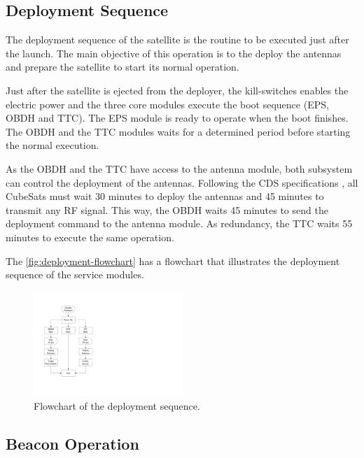 \subsection{Deployment Sequence}

The deployment sequence of the satellite is the routine to be executed just after the launch. The main objective of this operation is to the deploy the antennas and prepare the satellite to start its normal operation.

Just after the satellite is ejected from the deployer, the kill-switches enables the electric power and the three core modules execute the boot sequence (EPS, OBDH and TTC). The EPS module is ready to operate when the boot finishes. The OBDH and the TTC modules waits for a determined period before starting the normal execution.

As the OBDH and the TTC have access to the antenna module, both subsystem can control the deployment of the antennas. Following the CDS specifications \cite{cds}, all CubeSats must wait 30 minutes to deploy the antennas and 45 minutes to transmit any RF signal. This way, the OBDH waits 45 minutes to send the deployment command to the antenna module. As redundancy, the TTC waits 55 minutes to execute the same operation.

The \autoref{fig:deployment-flowchart} has a flowchart that illustrates the deployment sequence of the service modules.

\begin{figure}[!ht]
    \begin{center}
        \includegraphics[width=0.5\textwidth]{figures/deployment-flowchart.pdf}
        \caption{Flowchart of the deployment sequence.}
        \label{fig:deployment-flowchart}
    \end{center}
\end{figure}

\subsection{Beacon Operation}

